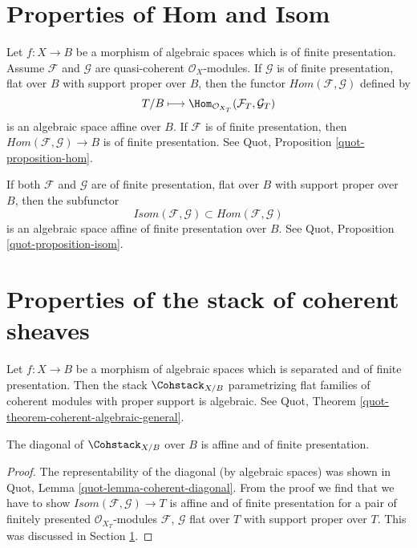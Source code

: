 \section{Properties of Hom and Isom}
\label{section-hom-isom}

\noindent
Let $f : X \to B$ be a morphism of algebraic spaces which is
of finite presentation. Assume $\mathcal{F}$ and $\mathcal{G}$
are quasi-coherent $\mathcal{O}_X$-modules.
If $\mathcal{G}$ is of finite presentation, flat over $B$
with support proper over $B$, then the functor
$\mathit{Hom}(\mathcal{F}, \mathcal{G})$ defined by
$$
T/B \longmapsto \Hom_{\mathcal{O}_{X_T}}(\mathcal{F}_T, \mathcal{G}_T)
$$
is an algebraic space affine over $B$. If $\mathcal{F}$ is of
finite presentation, then
$\mathit{Hom}(\mathcal{F}, \mathcal{G}) \to B$
is of finite presentation. See
Quot, Proposition \ref{quot-proposition-hom}.

\medskip\noindent
If both $\mathcal{F}$ and $\mathcal{G}$ are of finite presentation,
flat over $B$ with support proper over $B$, then the subfunctor
$$
\mathit{Isom}(\mathcal{F}, \mathcal{G}) \subset
\mathit{Hom}(\mathcal{F}, \mathcal{G})
$$
is an algebraic space affine of finite presentation over $B$.
See Quot, Proposition \ref{quot-proposition-isom}.




\section{Properties of the stack of coherent sheaves}
\label{section-stack-coherent-sheaves}

\noindent
Let $f : X \to B$ be a morphism of algebraic spaces which is
separated and of finite presentation. Then the stack
$\Cohstack_{X/B}$ parametrizing flat families of coherent
modules with proper support is algebraic. See
Quot, Theorem \ref{quot-theorem-coherent-algebraic-general}.

\begin{lemma}
\label{lemma-coherent-diagonal-affine-fp}
The diagonal of $\Cohstack_{X/B}$ over $B$ is affine
and of finite presentation.
\end{lemma}

\begin{proof}
The representability of the diagonal (by algebraic spaces)
was shown in Quot, Lemma \ref{quot-lemma-coherent-diagonal}.
From the proof we find that we have to show
$\mathit{Isom}(\mathcal{F}, \mathcal{G}) \to T$
is affine and of finite presentation for a pair of
finitely presented $\mathcal{O}_{X_T}$-modules
$\mathcal{F}$, $\mathcal{G}$ flat over $T$ with support
proper over $T$. This was discussed in Section \ref{section-hom-isom}.
\end{proof}

